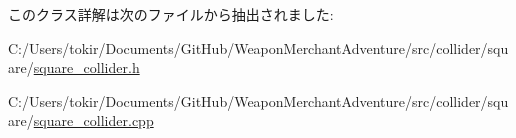 このクラス詳解は次のファイルから抽出されました\+:\begin{DoxyCompactItemize}
\item 
C\+:/\+Users/tokir/\+Documents/\+Git\+Hub/\+Weapon\+Merchant\+Adventure/src/collider/square/\mbox{\hyperlink{square__collider_8h}{square\+\_\+collider.\+h}}\item 
C\+:/\+Users/tokir/\+Documents/\+Git\+Hub/\+Weapon\+Merchant\+Adventure/src/collider/square/\mbox{\hyperlink{square__collider_8cpp}{square\+\_\+collider.\+cpp}}\end{DoxyCompactItemize}
